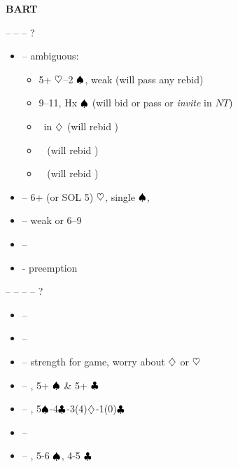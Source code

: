 \textbf{BART}

 --  --  -- ?
\begin{itemize}
  \item {} -- ambiguous:
    \begin{itemize}
      \item 5+ $\heartsuit$--2 $\spadesuit$, weak (will pass any rebid)
      \item 9--11, Hx $\spadesuit$ (will bid or pass  or \emph{invite} in $NT$)
      \item \inv\ in $\diamondsuit$ (will rebid )
      \item \so\ \ws{\c} (will rebid )
      \item \inv\ \ws{\c} (will rebid )
    \end{itemize}
  \item {} -- 6+ (or SOL 5) $\heartsuit$, single $\spadesuit$, \so
  \item {} -- weak \ws{} or 6--9 \wos{}
  \item {} -- \inv\ \wos{\c}
  \item \ctr{3\minor/\h} -\- preemption
\end{itemize}

 --  --  --  -- ?
\begin{itemize}
  \item {} -- \so\ \ws{\h}
  \item {} -- \so\ \wos{\h}
  \item {} -- strength for game, worry about $\diamondsuit$ or $\heartsuit$
  \item {} -- \gf, 5+ $\spadesuit$ \& 5+ $\clubsuit$
  \item {} -- \gf, 5$\spadesuit$-4$\clubsuit$-3(4)$\diamondsuit$-1(0)$\clubsuit$
  \item {} -- \gf\ \ws{\h}
  \item {} -- \gf, 5-6 $\spadesuit$, 4-5 $\clubsuit$
\end{itemize}
